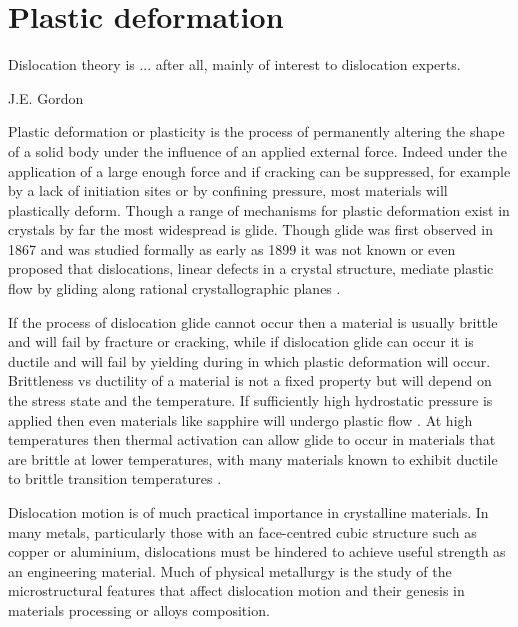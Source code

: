 
\chapter{Plastic deformation}  %

\textwidth
\epigraph{Dislocation theory is ... after all, mainly of interest to dislocation experts.}{J.E. Gordon}




\graphicspath{{Chapter1/Figs/Vector/}{Chapter1/Figs/Raster/}{Chapter1/Figs/PDF/}{Chapter1/Figs/}}

Plastic deformation or plasticity is the process of permanently altering the shape of a solid body under the influence of an applied external force. Indeed under the application of a large enough force and if cracking can be suppressed, for example by a lack of initiation sites or by confining pressure, most materials will plastically deform. Though a range of mechanisms for plastic deformation exist in crystals by far the most widespread is glide. Though glide was first observed in 1867 \cite{Reusch1867} and was studied formally as early as 1899 \cite{Ewing1899,Ewing1900} it was not known or even proposed that dislocations, linear defects in a crystal structure, mediate plastic flow by gliding along rational crystallographic planes \cite{Kelly2012ch7}.

If the process of dislocation glide cannot occur then a material is usually {brittle} and will fail by fracture or cracking, while if dislocation glide can occur it is {ductile} and will fail by yielding during in which plastic deformation will occur. Brittleness vs ductility of a material is not a fixed property but will depend on the stress state and the temperature. If sufficiently high hydrostatic pressure is applied then even materials like sapphire will undergo plastic flow \cite{Bridgman1947}. At high temperatures then thermal activation can allow glide to occur in materials that are brittle at lower temperatures, with many materials known to exhibit ductile to brittle transition temperatures   \cite{Kelly2012ch7}.

Dislocation motion is of much practical importance in crystalline materials. In many metals, particularly those with an face-centred cubic structure such as copper or aluminium, dislocations must be hindered to achieve useful strength as an engineering material. Much of physical metallurgy is the study of the microstructural features that affect dislocation motion and their genesis in materials processing or alloys composition.

